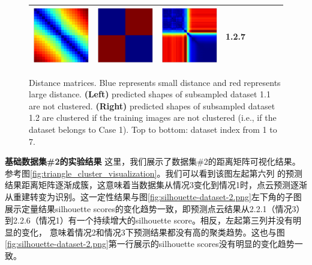 \documentclass[bachelor, nocolorlinks, printoneside]{seuthesis} %
\begin{document}
\begin{Main}
\begin{figure}[ht!]
\begin{centering}
\begin{tabular}{cccc|cccc}
        \includegraphics[width=0.12\columnwidth,keepaspectratio]{figs/toyset_matrices/cluster_2by10_7_1.png} &
        \includegraphics[width=0.12\columnwidth,keepaspectratio]{figs/toyset_matrices/cluster_2by10_7_2.png} &
        \includegraphics[width=0.12\columnwidth,keepaspectratio]{figs/toyset_matrices/cluster_2by10_7_3.png} & 1.2.7\\
        \bottomrule  
        \end{tabular}  \vspace{-2mm}
        \caption{\small Distance matrices. Blue represents small distance and red represents large distance. {\bf (Left)} predicted shapes of subsampled dataset 1.1 are not clustered. {\bf (Right)} predicted shapes of subsampled dataset 1.2 are clustered if the training images are not clustered (i.e., if the dataset belongs to Case 1). Top to bottom: dataset index from 1 to 7.}
        \label{fig:cluster_visualization}
    \end{centering}
    \end{figure}
\FloatBarrier
\textbf{基础数据集\#2的实验结果} 这里，我们展示了数据集\#2的距离矩阵可视化结果。参考图\ref{fig:triangle_cluster_visualization}。我们可以看到该图左起第六列
的预测结果距离矩阵逐渐成簇，这意味着当数据集从情况3变化到情况1时，点云预测逐渐从重建转变为识别。这一定性结果与图\ref{fig:silhouette-dataset-2.png}左下角的子图
展示定量结果silhouette scores的变化趋势一致，即预测点云结果从2.2.1（情况3）到2.2.6（情况1）有一个持续增大的silhouette score。相反，左起第三列并没有明显的变化，
意味着情况2和情况3下预测结果都没有高的聚类趋势。这也与图\ref{fig:silhouette-dataset-2.png}第一行展示的silhouette scores没有明显的变化趋势一致。



\end{Main}
\end{document}
